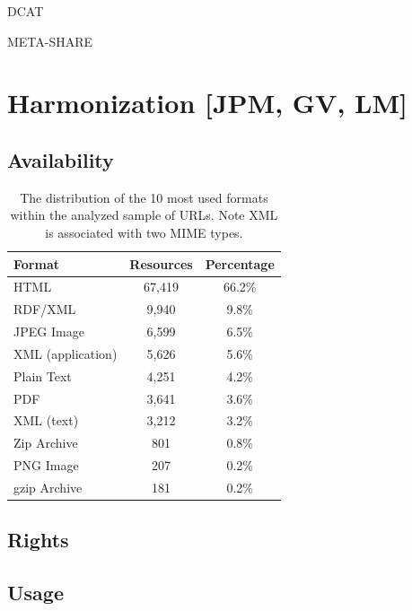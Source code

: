 \documentclass[smallextended]{svjour3}       %
\begin{document}
DCAT

META-SHARE

\section{Harmonization [JPM, GV, LM]}

\label{harmonization}

\subsection{Availability}

\begin{table}
    \begin{center}
	\begin{tabular}{l|cc}
            Format   & Resources  & Percentage\\
		
		\hline                                              
                HTML                &	67,419 & 66.2\%\\
                RDF/XML             &	9,940  & 9.8\% \\
                JPEG Image          &   6,599  & 6.5\% \\
                XML (application)   &	5,626  & 5.6\% \\
                Plain Text          & 4,251    & 4.2\% \\
                PDF                 &	3,641  & 3.6\% \\
                XML (text)          & 3,212    & 3.2\% \\
                Zip Archive         &	801    & 0.8\% \\
                PNG Image           & 207      & 0.2\% \\
                gzip Archive        & 181      & 0.2\% \\
	\end{tabular}
    \end{center}
	\caption{\label{tab:formats}The distribution of the 10 most used formats within the
        analyzed sample of URLs. Note XML is associated with two MIME types.}
\end{table}

\subsection{Rights}

\subsection{Usage}
\end{document}

